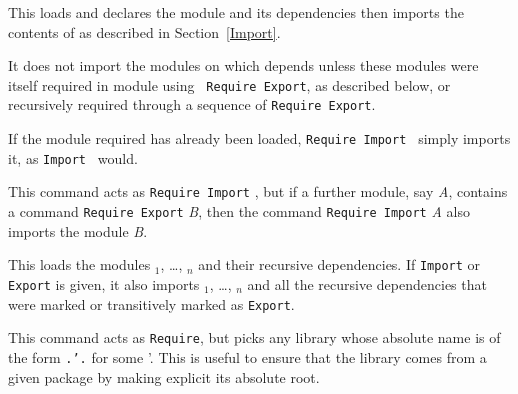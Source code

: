 \begin{Variants}
\item {} 

  This loads and declares the module {\qualid} and its dependencies
  then imports the contents of {\qualid} as described in
  Section~\ref{Import}.

  It does not import the modules on which {\qualid} depends unless
  these modules were itself required in module {\qualid} using {\tt
  Require Export}, as described below, or recursively required through
  a sequence of {\tt Require Export}.

  If the module required has already been loaded, {\tt Require Import
  {\qualid}} simply imports it, as {\tt Import {\qualid}} would.

\item {}

  This command acts as {\tt Require Import} {\qualid}, but if a
  further module, say {\it A}, contains a command {\tt Require
  Export} {\it B}, then the command {\tt Require Import} {\it A}
  also imports the module {\it B}.

\item {}

  This loads the modules {\qualid}$_1$, \ldots, {\qualid}$_n$ and
  their recursive dependencies. If {\tt Import} or {\tt Export} is
  given, it also imports {\qualid}$_1$, \ldots, {\qualid}$_n$ and all
  the recursive dependencies that were marked or transitively marked
  as {\tt Export}.

\item {}

  This command acts as {\tt Require}, but picks any library whose absolute name
  is of the form {\tt{\dirpath}.{\dirpath'}.{\qualid}} for some {\dirpath'}.
  This is useful to ensure that the {\qualid} library comes from a given
  package by making explicit its absolute root.

\end{Variants}

